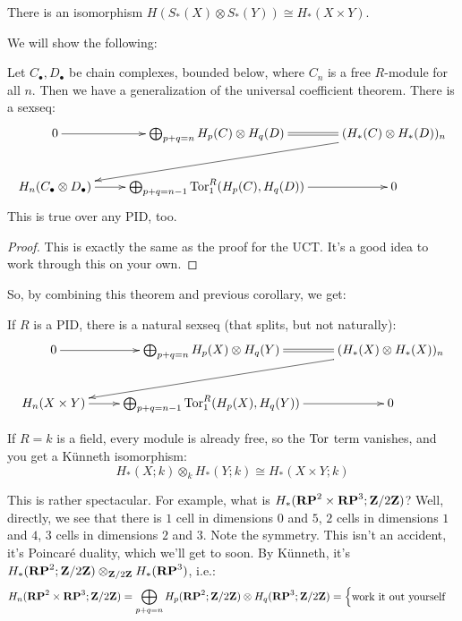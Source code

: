 \begin{corollary}
There is an isomorphism $ H(S_\ast(X)\otimes S_\ast(Y))\cong H_\ast(X\times Y)$.
\end{corollary}
We will show the following:
\begin{theorem}
Let $C_\bullet,D_\bullet$ be chain complexes, bounded below, where $C_n$ is a free $R$-module for all $n$. Then we have a generalization of the universal coefficient theorem. There is a sexseq:
\begin{equation*}
\xymatrix{0\ar[r] & \bigoplus_{p+q=n} H_p(C)\otimes H_q(D)\ar@{=}[r] & ( H_\ast(C)\otimes H_\ast(D))_n\ar[dll]\\
 H_n(C_\bullet\otimes D_\bullet)\ar[r] & \bigoplus_{p+q=n-1}\Tor^R_1( H_p(C), H_q(D))\ar[r] & 0}
\end{equation*}
This is true over any PID, too.
\end{theorem}
\begin{proof}
This is exactly the same as the proof for the UCT. It's a good idea to work through this on your own.
\end{proof}
So, by combining this theorem and previous corollary, we get:
\begin{theorem}
If $R$ is a PID, there is a natural sexseq (that splits, but not naturally):
\begin{equation*}
\xymatrix{0\ar[r] & \bigoplus_{p+q=n} H_p(X)\otimes H_q(Y)\ar@{=}[r] & ( H_\ast(X)\otimes H_\ast(X))_n\ar[dll]\\
 H_n(X\times Y)\ar[r] & \bigoplus_{p+q=n-1}\Tor^R_1( H_p(X), H_q(Y))\ar[r] & 0}
\end{equation*}
\end{theorem}
\begin{example}
If $R=k$ is a field, every module is already free, so the $\operatorname{Tor}$ term vanishes, and you get a K\"{u}nneth isomorphism:
\begin{equation*}
 H_\ast(X;k)\otimes_k H_\ast(Y;k)\cong H_\ast(X\times Y;k)
\end{equation*}
\end{example}
This is rather spectacular. For example, what is $ H_\ast(\mathbf{RP}^2\times\mathbf{RP}^3;\mathbf Z/2\mathbf Z)$? Well, directly, we see that there is $1$ cell in dimensions $0$ and $5$, $2$ cells in dimensions $1$ and $4$, $3$ cells in dimensions $2$ and $3$. Note the symmetry. This isn't an accident, it's Poincar\'{e} duality, which we'll get to soon. By K\"{u}nneth, it's $ H_\ast(\mathbf{RP}^2;\mathbf Z/2\mathbf Z)\otimes_{\mathbf Z/2\mathbf Z} H_\ast(\mathbf{RP}^3)$, i.e.:
\begin{equation*}
 H_n(\mathbf{RP}^2\times\mathbf{RP}^3;\mathbf Z/2\mathbf Z)=\bigoplus_{p+q=n} H_p(\mathbf{RP}^2;\mathbf Z/2\mathbf Z)\otimes H_q(\mathbf{RP}^3;\mathbf Z/2\mathbf Z)=\begin{cases}
\text{work it out yourself}
\end{cases}
\end{equation*}
